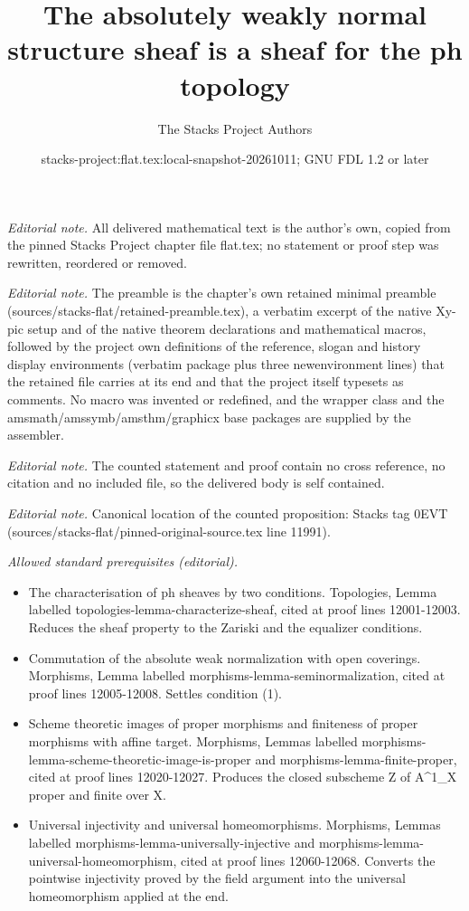 \documentclass[10pt,a4paper]{amsart}
\title{The absolutely weakly normal structure sheaf is a sheaf for the ph topology}
\author{The Stacks Project Authors}
\date{stacks-project:flat.tex:local-snapshot-20261011; GNU FDL 1.2 or later}
\theoremstyle{plain}
\theoremstyle{definition}
\theoremstyle{remark}
\numberwithin{equation}{subsection}
\begin{document}
\maketitle
\noindent\textit{Editorial note.} All delivered mathematical text is the author's own, copied from the pinned Stacks Project chapter file flat.tex; no statement or proof step was rewritten, reordered or removed.\par\medskip
\noindent\textit{Editorial note.} The preamble is the chapter's own retained minimal preamble (sources/stacks-flat/retained-preamble.tex), a verbatim excerpt of the native Xy-pic setup and of the native theorem declarations and mathematical macros, followed by the project own definitions of the reference, slogan and history display environments (verbatim package plus three newenvironment lines) that the retained file carries at its end and that the project itself typesets as comments. No macro was invented or redefined, and the wrapper class and the amsmath/amssymb/amsthm/graphicx base packages are supplied by the assembler.\par\medskip
\noindent\textit{Editorial note.} The counted statement and proof contain no cross reference, no citation and no included file, so the delivered body is self contained.\par\medskip
\noindent\textit{Editorial note.} Canonical location of the counted proposition: Stacks tag 0EVT (sources/stacks-flat/pinned-original-source.tex line 11991).\par\medskip
\noindent\textit{Allowed standard prerequisites (editorial).}\begin{itemize}
\item The characterisation of ph sheaves by two conditions. Topologies, Lemma labelled topologies-lemma-characterize-sheaf, cited at proof lines 12001-12003. Reduces the sheaf property to the Zariski and the equalizer conditions.
\item Commutation of the absolute weak normalization with open coverings. Morphisms, Lemma labelled morphisms-lemma-seminormalization, cited at proof lines 12005-12008. Settles condition (1).
\item Scheme theoretic images of proper morphisms and finiteness of proper morphisms with affine target. Morphisms, Lemmas labelled morphisms-lemma-scheme-theoretic-image-is-proper and morphisms-lemma-finite-proper, cited at proof lines 12020-12027. Produces the closed subscheme Z of A\textasciicircum{}1\_X proper and finite over X.
\item Universal injectivity and universal homeomorphisms. Morphisms, Lemmas labelled morphisms-lemma-universally-injective and morphisms-lemma-universal-homeomorphism, cited at proof lines 12060-12068. Converts the pointwise injectivity proved by the field argument into the universal homeomorphism applied at the end.
\end{itemize}\medskip
\end{document}
